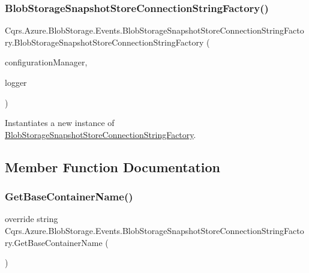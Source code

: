 \subsubsection{\texorpdfstring{Blob\+Storage\+Snapshot\+Store\+Connection\+String\+Factory()}{BlobStorageSnapshotStoreConnectionStringFactory()}}
{\footnotesize\ttfamily Cqrs.\+Azure.\+Blob\+Storage.\+Events.\+Blob\+Storage\+Snapshot\+Store\+Connection\+String\+Factory.\+Blob\+Storage\+Snapshot\+Store\+Connection\+String\+Factory (\begin{DoxyParamCaption}\item[{\hyperlink{interfaceCqrs_1_1Configuration_1_1IConfigurationManager}{I\+Configuration\+Manager}}]{configuration\+Manager,  }\item[{I\+Logger}]{logger }\end{DoxyParamCaption})}



Instantiates a new instance of \hyperlink{classCqrs_1_1Azure_1_1BlobStorage_1_1Events_1_1BlobStorageSnapshotStoreConnectionStringFactory}{Blob\+Storage\+Snapshot\+Store\+Connection\+String\+Factory}. 



\subsection{Member Function Documentation}
\mbox{\label{classCqrs_1_1Azure_1_1BlobStorage_1_1Events_1_1BlobStorageSnapshotStoreConnectionStringFactory_a0b73f62d5148d477fe76d78f4171dac6_a0b73f62d5148d477fe76d78f4171dac6}} 
\subsubsection{\texorpdfstring{Get\+Base\+Container\+Name()}{GetBaseContainerName()}}
{\footnotesize\ttfamily override string Cqrs.\+Azure.\+Blob\+Storage.\+Events.\+Blob\+Storage\+Snapshot\+Store\+Connection\+String\+Factory.\+Get\+Base\+Container\+Name (\begin{DoxyParamCaption}{ }\end{DoxyParamCaption})\hspace{0.3cm}{\ttfamily [virtual]}}



